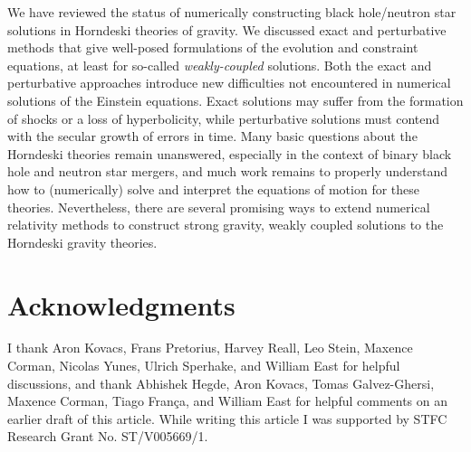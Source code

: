 \documentclass{ws-ijmpd}
\begin{document}
We have reviewed the status of numerically constructing 
black hole/neutron star solutions in Horndeski theories of gravity.
We discussed exact and perturbative
methods that give well-posed formulations of the evolution and constraint
equations, at least for so-called \emph{weakly-coupled} solutions.
Both the exact and perturbative approaches introduce new difficulties
not encountered in numerical solutions of the Einstein equations. 
Exact solutions may suffer from the formation of shocks or
a loss of hyperbolicity, while perturbative solutions must contend
with the secular growth of errors in time.
Many basic questions about the Horndeski theories remain unanswered,
especially in the context of binary black hole and neutron star mergers,
and much work remains to properly understand how to (numerically)
solve and interpret the equations of motion for these theories.
Nevertheless, there are several promising ways to extend numerical relativity  
methods to construct strong gravity, weakly coupled 
solutions to the Horndeski gravity theories.

\section*{Acknowledgments}

 I thank  
 Aron Kovacs, Frans Pretorius,
 Harvey Reall, Leo Stein, Maxence Corman, 
 Nicolas Yunes, Ulrich Sperhake,  and William East
 for helpful discussions,
 and thank Abhishek Hegde, Aron Kovacs, 
 Tomas Galvez-Ghersi, Maxence Corman, 
 Tiago Fran\c{c}a, and William East
 for helpful comments on an earlier
 draft of this article.
 While writing this article I was
 supported by STFC Research Grant No. ST/V005669/1.

\appendix

\end{document}
